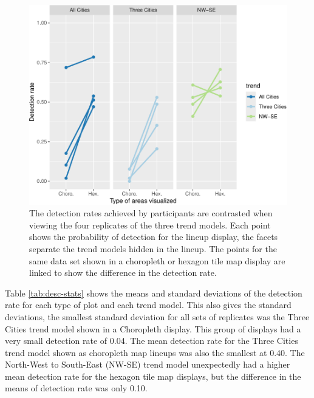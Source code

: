 \documentclass[times, doublespace]{anzsauth}
\begin{document}
\begin{figure}
\includegraphics[width=1\linewidth]{paper_files/figure-latex/detect-compare-1} \caption{The detection rates achieved by participants are contrasted when viewing the four replicates of the three trend models. Each point shows the probability of detection for the lineup display, the facets separate the trend models hidden in the lineup. The points for the same data set shown in a choropleth or hexagon tile map display are linked to show the difference in the detection rate.}\label{fig:detect-compare}
\end{figure}

Table \ref{tab:desc-stats} shows the means and standard deviations of
the detection rate for each type of plot and each trend model. This also
gives the standard deviations, the smallest standard deviation for all
sets of replicates was the Three Cities trend model shown in a
Choropleth display. This group of displays had a very small detection
rate of 0.04. The mean detection rate for the Three Cities trend model
shown as choropleth map lineups was also the smallest at 0.40. The
North-West to South-East (NW-SE) trend model unexpectedly had a higher
mean detection rate for the hexagon tile map displays, but the
difference in the means of detection rate was only 0.10.
\end{document}
